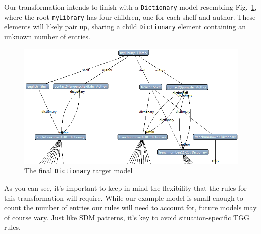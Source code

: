 \newpage

Our transformation intends to finish with a \texttt{Dictionary} model resembling
Fig.~\ref{eclipse:dictionaryStart}, where the root \texttt{myLibrary} has four children, one for each shelf and author. These elements will likely pair up, sharing a child \texttt{Dictionary} element containing an unknown number
of entries.

\vspace{1cm}

\begin{figure}[htbp]
\hspace{-1.5cm}
    \includegraphics[width=1.2\textwidth]{eclipse_DictionaryResultMetamodel}
 	\caption{The final \texttt{Dictionary} target model}
 	\label{eclipse:dictionaryStart}
\end{figure}

\vspace{1cm}

As you can see, it's important to keep in mind the flexibility that the rules for this transformation will require. While our example model is small
enough to count the number of entries our rules will need to account for, future models may of course vary. Just like SDM patterns, it's key to avoid
situation-specific TGG rules.




